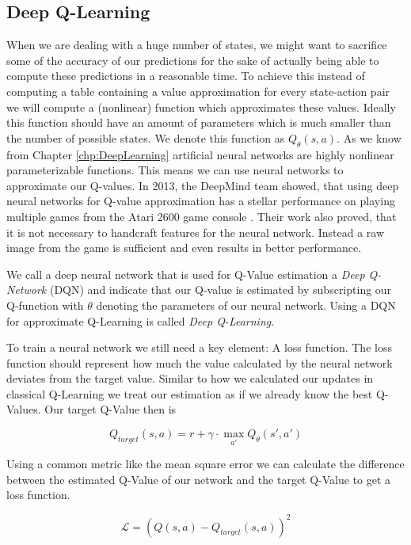 \subsection{Deep Q-Learning} \label{ssec:DeepQLearning}
When we are dealing with a huge number of states, we might want to sacrifice some of the accuracy of our predictions for the sake of actually being able to compute these predictions in a reasonable time. To achieve this instead of computing a table containing a value approximation for every state-action pair we will compute a (nonlinear) function which approximates these values. Ideally this function should have an amount of parameters which is much smaller than the number of possible states. We denote this function as $Q_\theta(s, a)$. As we know from Chapter \ref{chp:DeepLearning} artificial neural networks are highly nonlinear parameterizable functions. This means we can use neural networks to approximate our Q-values. In 2013, the DeepMind team showed, that using deep neural networks for Q-value approximation has a stellar performance on playing multiple games from the Atari 2600 game console \cite{mnih2013playing}. Their work also proved, that it is not necessary to handcraft features for the neural network. Instead a raw image from the game is sufficient and even results in better performance.

We call a deep neural network that is used for Q-Value estimation a \textit{Deep Q-Network} (DQN) and indicate that our Q-value is estimated by subscripting our Q-function with $\theta$ denoting the parameters of our neural network. Using a DQN for approximate Q-Learning is called \textit{Deep Q-Learning}.

To train a neural network we still need a key element: A loss function. The loss function should represent how much the value calculated by the neural network deviates from the target value. Similar to how we calculated our updates in classical Q-Learning we treat our estimation as if we already know the best Q-Values. Our target Q-Value then is 

\[Q_{target}(s, a) = r + \gamma \cdot \max_{a'}Q_\theta(s', a')\]

Using a common metric like the mean square error we can calculate the difference between the estimated Q-Value of our network and the target Q-Value to get a loss function.

\[\mathcal{L} = (Q(s, a) - Q_{target}(s, a))^2\]

